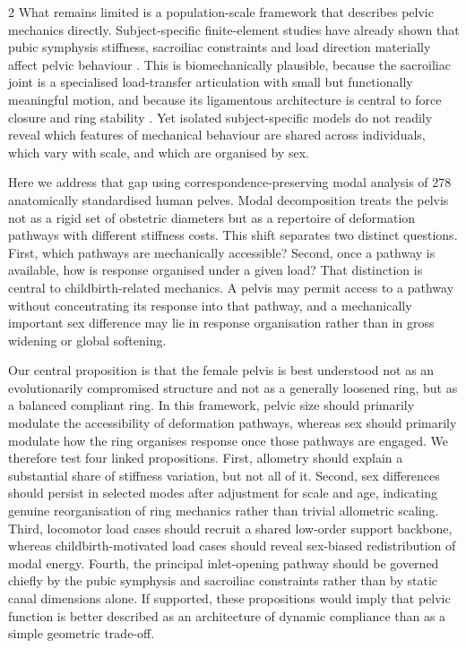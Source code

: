 \documentclass[openacc]{rsproca_new}
\begin{document}
\begin{multicols}{2}
What remains limited is a population-scale framework that describes pelvic mechanics directly. Subject-specific finite-element studies have already shown that pubic symphysis stiffness, sacroiliac constraints and load direction materially affect pelvic behaviour \cite{Eichenseer2011,Hammer2013}. This is biomechanically plausible, because the sacroiliac joint is a specialised load-transfer articulation with small but functionally meaningful motion, and because its ligamentous architecture is central to force closure and ring stability \cite{Vleeming2012,Kiapour2019,ChoKwak2020}. Yet isolated subject-specific models do not readily reveal which features of mechanical behaviour are shared across individuals, which vary with scale, and which are organised by sex.

Here we address that gap using correspondence-preserving modal analysis of 278 anatomically standardised human pelves. Modal decomposition treats the pelvis not as a rigid set of obstetric diameters but as a repertoire of deformation pathways with different stiffness costs. This shift separates two distinct questions. First, which pathways are mechanically accessible? Second, once a pathway is available, how is response organised under a given load? That distinction is central to childbirth-related mechanics. A pelvis may permit access to a pathway without concentrating its response into that pathway, and a mechanically important sex difference may lie in response organisation rather than in gross widening or global softening.

Our central proposition is that the female pelvis is best understood not as an evolutionarily compromised structure and not as a generally loosened ring, but as a balanced compliant ring. In this framework, pelvic size should primarily modulate the accessibility of deformation pathways, whereas sex should primarily modulate how the ring organises response once those pathways are engaged. We therefore test four linked propositions. First, allometry should explain a substantial share of stiffness variation, but not all of it. Second, sex differences should persist in selected modes after adjustment for scale and age, indicating genuine reorganisation of ring mechanics rather than trivial allometric scaling. Third, locomotor load cases should recruit a shared low-order support backbone, whereas childbirth-motivated load cases should reveal sex-biased redistribution of modal energy. Fourth, the principal inlet-opening pathway should be governed chiefly by the pubic symphysis and sacroiliac constraints rather than by static canal dimensions alone. If supported, these propositions would imply that pelvic function is better described as an architecture of dynamic compliance than as a simple geometric trade-off.


\end{multicols}
\end{document}
